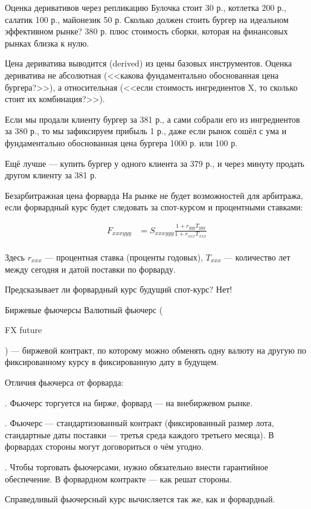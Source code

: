 \documentclass{beamer}
\newcommand{\en}[1]{\begin{otherlanguage}{english}#1\end{otherlanguage}}
\begin{document}
\begin{frame}{Оценка деривативов через репликацию}
\justify
Булочка стоит 30 р., котлетка 200 р., салатик 100 р., майонезик 50 р. Сколько должен стоить бургер на идеальном эффективном рынке? 380 р. плюс стоимость сборки, которая на финансовых рынках близка к нулю.

\justify
Цена дериватива выводится (derived) из цены базовых инструментов. Оценка дериватива
не абсолютная (<<какова фундаментально обоснованная цена бургера?>>), а относительная (<<если стоимость ингредиентов X, то сколько стоит их комбинация?>>).

\justify
Если мы продали клиенту бургер за 381 р., а сами собрали его из ингредиентов за 380 р., то мы зафиксируем прибыль 1 р., даже если рынок сошёл с ума и фундаментально обоснованная цена бургера 1000 р. или 100 р.

\justify
Ещё лучше --- купить бургер у одного клиента за 379 р., и через минуту продать
другом клиенту за 381 р.
\end{frame}



\begin{frame}{Безарбитражная цена форварда}
\justify
На рынке не будет возможностей для арбитража, если форвардный курс будет следовать за спот-курсом и процентными ставками:

\begin{align*}
F_{xxxyyy} &= S_{xxxyyy} \frac{1 + r_{yyy}T_{yyy}}{1 + r_{xxx}T_{xxx}} \\
\end{align*}

Здесь $r_{xxx}$ --- процентная ставка (проценты годовых), $T_{xxx}$ --- количество лет между сегодня и датой поставки по форварду.

\justify
Предсказывает ли форвардный курс будущий спот-курс? Нет!
\end{frame}



\begin{frame}{Биржевые фьючерсы}
\justify
\alert{Валютный фьючерс} (\en{FX future}) --- биржевой контракт, по которому можно обменять одну валюту на другую по фиксированному курсу в фиксированную дату в будущем.

\justify
Отличия фьючерса от форварда:

. Фьючерс торгуется на бирже, форвард --- на внебиржевом рынке.

. Фьючерс --- стандартизованный контракт (фиксированный размер лота, стандартные даты поставки --- третья среда каждого третьего месяца). В форвардах стороны могут договориться о чём угодно.

. Чтобы торговать фьючерсами, нужно обязательно внести гарантийное обеспечение. В форвардном контракте --- как решат стороны.

\justify
Справедливый фьючерсный курс вычисляется так же, как и форвардный.
\end{frame}
\end{document}
